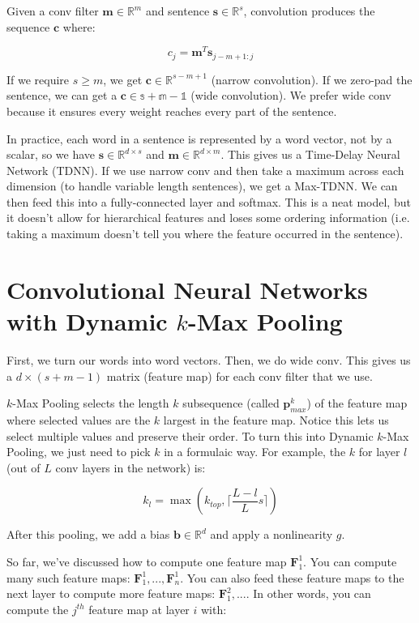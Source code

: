 \documentclass[a4paper]{article}
\begin{document}
Given a conv filter $\mathbf{m} \in \mathbb{R}^m$ and sentence $\mathbf{s} \in
\mathbb{R}^{s}$, convolution produces the sequence $\mathbf{c}$ where:

$$
c_j = \mathbf{m}^T \mathbf{s}_{j-m+1:j}
$$

If we require $s \geq m$, we get $\mathbf{c} \in \mathbb{R}^{s-m+1}$ (narrow
convolution). If we zero-pad the sentence, we can get a $\mathbf{c} \in \mathbb{
s+m-1}$ (wide convolution). We prefer wide conv because it ensures every weight
reaches every part of the sentence.

In practice, each word in a sentence is represented by a word vector, not by
a scalar, so we have $\mathbf{s} \in \mathbb{R}^{d \times s}$ and $\mathbf{m}
\in \mathbb{R}^{d \times m}$. This gives us a Time-Delay Neural Network (TDNN).
If we use narrow conv and then take a maximum across each dimension (to handle
variable length sentences), we get a Max-TDNN. We can then feed this into
a fully-connected layer and softmax. This is a neat model, but it doesn't
allow for hierarchical features and loses some ordering information (i.e.
taking a maximum doesn't tell you where the feature occurred in the sentence).

\section{Convolutional Neural Networks with Dynamic $k$-Max Pooling}
First, we turn our words into word vectors. Then, we do wide conv. This gives
us a $d \times (s + m - 1)$ matrix (feature map) for each conv filter that we
use.

$k$-Max Pooling selects the length $k$ subsequence (called
$\mathbf{p}_{max}^k$) of the feature map where selected values are the $k$
largest in the feature map. Notice this lets us select multiple values and
preserve their order. To turn this into Dynamic $k$-Max Pooling, we just need
to pick $k$ in a formulaic way. For example, the $k$ for layer $l$ (out of
$L$ conv layers in the network) is:

$$
k_l = \max{(k_{top}, \lceil \frac{L - l}{L} s \rceil)}
$$

After this pooling, we add a bias $\mathbf{b} \in \mathbb{R}^{d}$ and apply
a nonlinearity $g$.

So far, we've discussed how to compute one feature map $\mathbf{F}_{1}^{1}$.
You can compute many such feature maps:
$\mathbf{F}_{1}^{1}, ..., \mathbf{F}_{n}^{1}$. You can also feed these feature
maps to the next layer to compute more feature maps: $\mathbf{F}_{1}^{2}, ...$.
In other words, you can compute the $j^{th}$ feature map at layer $i$ with:
\end{document}
